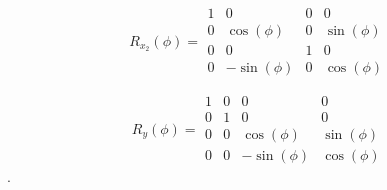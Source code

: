 \documentclass[titlepage]{scrartcl}
\begin{document}
\begin{equation}
R_{x_2}(\phi) = \begin{array}{cccc}
1 & 0 & 0 & 0 \\ 
0 & \cos(\phi) & 0 & \sin(\phi) \\ 
0 & 0 & 1 & 0 \\ 
0 & -\sin(\phi) & 0 & \cos(\phi)
\end{array} 
\end{equation}

\begin{equation}
R_{y}(\phi) = \begin{array}{cccc}
1 & 0 & 0 & 0\\ 
0 & 1 & 0 & 0 \\ 
0 & 0 & \cos(\phi) & \sin(\phi) \\ 
0 & 0 & -\sin(\phi) & \cos(\phi)
\end{array} 
\end{equation}.
\end{document}
